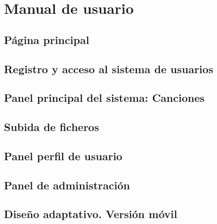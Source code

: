 \section{Manual de usuario}
\label{sec:manual}

\subsection{Página principal}

\subsection{Registro y acceso al sistema de usuarios}

\subsection{Panel principal del sistema: Canciones}

\subsection{Subida de ficheros}

\subsection{Panel perfil de usuario}

\subsection{Panel de administración}

\subsection{Diseño adaptativo. Versión móvil}

\newpage